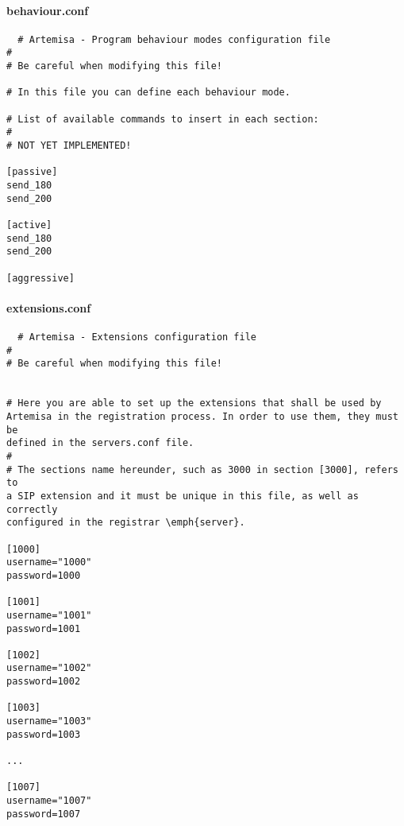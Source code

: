 \documentclass[a4paper,12pt]{report}
\newenvironment{myscriptlisting}
{\begin{list}{}{\setlength{\leftmargin}{1em}}\item\scriptsize\bfseries}
{\end{list}}
\begin{document}
\paragraph{behaviour.conf}
\begin{myscriptlisting}
 \begin{verbatim}
  # Artemisa - Program behaviour modes configuration file
#
# Be careful when modifying this file! 

# In this file you can define each behaviour mode.

# List of available commands to insert in each section:
#
# NOT YET IMPLEMENTED!

[passive]
send_180
send_200

[active]
send_180
send_200

[aggressive]

 \end{verbatim}
\end{myscriptlisting}

\paragraph{extensions.conf}
\begin{myscriptlisting}
 \begin{verbatim}
  # Artemisa - Extensions configuration file
#
# Be careful when modifying this file! 


# Here you are able to set up the extensions that shall be used by
Artemisa in the registration process. In order to use them, they must be
defined in the servers.conf file.
#
# The sections name hereunder, such as 3000 in section [3000], refers to
a SIP extension and it must be unique in this file, as well as correctly
configured in the registrar \emph{server}.

[1000]
username="1000"
password=1000

[1001]
username="1001"
password=1001

[1002]
username="1002"
password=1002

[1003]
username="1003"
password=1003

...

[1007]
username="1007"
password=1007
 \end{verbatim}
\end{myscriptlisting}
\end{document}
